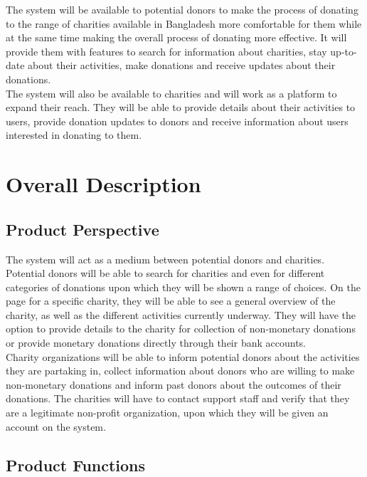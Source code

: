 \documentclass{scrreprt}
\begin{document}
The system will be available to potential donors to make the process of donating to the range of charities available in Bangladesh more comfortable for them while at the same time making the overall process of donating more effective. It will provide them with features to search for information about charities, stay up-to-date about their activities, make donations and receive updates about their donations.\\

The system will also be available to charities and will work as a platform to expand their reach. They will be able to provide details about their activities to users, provide donation updates to donors and receive information about users interested in donating to them.\\

\chapter{Overall Description}

\section{Product Perspective}

The system will act as a medium between potential donors and charities.\\

Potential donors will be able to search for charities and even for different categories of donations upon which they will be shown a range of choices. On the page for a specific charity, they will be able to see a general overview of the charity, as well as the different activities currently underway. They will have the option to provide details to the charity for collection of non-monetary donations or provide monetary donations directly through their bank accounts.\\

Charity organizations will be able to inform potential donors about the activities they are partaking in, collect information about donors who are willing to make non-monetary donations and inform past donors about the outcomes of their donations. The charities will have to contact support staff and verify that they are a legitimate non-profit organization, upon which they will be given an account on the system.\\


\section{Product Functions}
\end{document}
